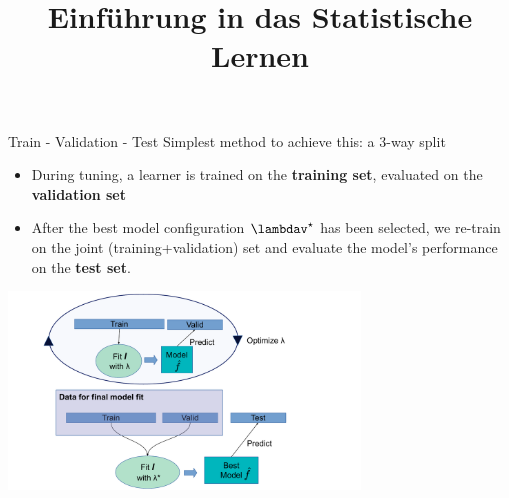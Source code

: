 \documentclass[11pt,compress,t,notes=noshow, xcolor=table]{beamer}
\title{Einführung in das Statistische Lernen}
\institute{\href{https://compstat-lmu.github.io/lecture_i2ml/}{compstat-lmu.github.io/lecture\_i2ml}}
\date{}
\begin{document}











\begin{vbframe}{Train - Validation - Test}
Simplest method to achieve this: a 3-way split
\begin{itemize}
\item During tuning, a learner is trained on the \textbf{training set},
  evaluated on the  \textbf{validation set}
\item After the best model configuration $\lambdav^\star$ has been selected, we re-train on the joint (training+validation) set and evaluate the model's performance on the \textbf{test set}.
\end{itemize}
\begin{center}
\includegraphics[width=0.7\textwidth]{figure_man/train_valid_test.pdf}
\end{center}
\end{vbframe}
\end{document}
